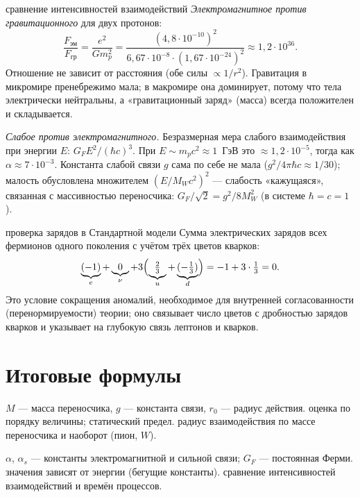 \begin{derivation}[label=der:14:compare]{сравнение интенсивностей взаимодействий}
\emph{Электромагнитное против гравитационного} для двух протонов:
\[
  \frac{F_{\text{эм}}}{F_{\text{гр}}}=\frac{e^2}{Gm_p^2}=\frac{(4{,}8\cdot10^{-10})^2}{6{,}67\cdot10^{-8}\cdot(1{,}67\cdot10^{-24})^2}\approx1{,}2\cdot10^{36}.
\]
Отношение не зависит от расстояния (обе силы $\propto1/r^2$). Гравитация в микромире пренебрежимо мала;
в макромире она доминирует, потому что тела электрически нейтральны, а «гравитационный заряд» (масса) всегда
положителен и складывается.

\emph{Слабое против электромагнитного.} Безразмерная мера слабого взаимодействия при энергии $E$:
$G_FE^2/(\hbar c)^3$. При $E\sim m_pc^2\approx1$~ГэВ это $\approx1{,}2\cdot10^{-5}$, тогда как $\alpha\approx7\cdot10^{-3}$. Константа
слабой связи $g$ сама по себе не мала ($g^2/4\pi\hbar c\approx1/30$); малость обусловлена множителем
$(E/M_Wc^2)^2$ — слабость «кажущаяся», связанная с массивностью переносчика:
$G_F/\sqrt2=g^2/8M_W^2$ (в системе $\hbar=c=1$).
\end{derivation}

\begin{derivation}[label=der:14:charges]{проверка зарядов в Стандартной модели}
Сумма электрических зарядов всех фермионов одного поколения с учётом трёх цветов кварков:
\[
  \underbrace{(-1)}_{e}+\underbrace{0}_{\nu}+3\Bigl(\underbrace{\tfrac23}_{u}+\underbrace{(-\tfrac13)}_{d}\Bigr)=-1+3\cdot\tfrac13=0 .
\]
Это условие сокращения аномалий, необходимое для внутренней согласованности (перенормируемости) теории;
оно связывает число цветов с дробностью зарядов кварков и указывает на глубокую связь лептонов и кварков.
\end{derivation}

\section{Итоговые формулы}

 {$M$ — масса переносчика, $g$ — константа связи, $r_0$ — радиус действия.}
 {оценка по порядку величины; статический предел.}
 {радиус взаимодействия по массе переносчика и наоборот (пион, $W$).}

 {$\alpha$, $\alpha_s$ — константы электромагнитной и сильной связи; $G_F$ — постоянная Ферми.}
 {значения зависят от энергии (бегущие константы).}
 {сравнение интенсивностей взаимодействий и времён процессов.}

